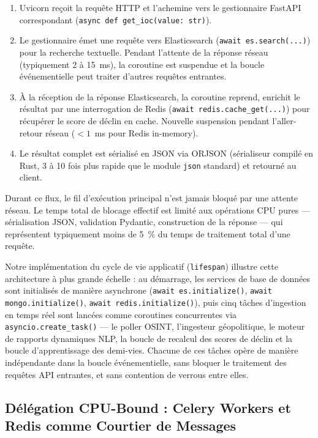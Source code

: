 \begin{enumerate}
    \item Uvicorn reçoit la requête HTTP et l'achemine vers le gestionnaire FastAPI correspondant (\texttt{async def get\_ioc(value: str)}).
    \item Le gestionnaire émet une requête vers Elasticsearch (\texttt{await es.search(...)}) pour la recherche textuelle. Pendant l'attente de la réponse réseau (typiquement 2 à 15~ms), la coroutine est suspendue et la boucle événementielle peut traiter d'autres requêtes entrantes.
    \item À la réception de la réponse Elasticsearch, la coroutine reprend, enrichit le résultat par une interrogation de Redis (\texttt{await redis.cache\_get(...)}) pour récupérer le score de déclin en cache. Nouvelle suspension pendant l'aller-retour réseau ($<1$~ms pour Redis in-memory).
    \item Le résultat complet est sérialisé en JSON via ORJSON (sérialiseur compilé en Rust, 3 à 10 fois plus rapide que le module \texttt{json} standard) et retourné au client.
\end{enumerate}

Durant ce flux, le fil d'exécution principal n'est jamais bloqué par une attente réseau. Le temps total de blocage effectif est limité aux opérations CPU pures --- sérialisation JSON, validation Pydantic, construction de la réponse --- qui représentent typiquement moins de 5~\% du temps de traitement total d'une requête.

Notre implémentation du cycle de vie applicatif (\texttt{lifespan}) illustre cette architecture à plus grande échelle : au démarrage, les services de base de données sont initialisés de manière asynchrone (\texttt{await es.initialize()}, \texttt{await mongo.initialize()}, \texttt{await redis.initialize()}), puis cinq tâches d'ingestion en temps réel sont lancées comme coroutines concurrentes via \texttt{asyncio.create\_task()} --- le poller OSINT, l'ingesteur géopolitique, le moteur de rapports dynamiques NLP, la boucle de recalcul des scores de déclin et la boucle d'apprentissage des demi-vies. Chacune de ces tâches opère de manière indépendante dans la boucle événementielle, sans bloquer le traitement des requêtes API entrantes, et sans contention de verrous entre elles.

\subsection{Délégation CPU-Bound : Celery Workers et Redis comme Courtier de Messages}

